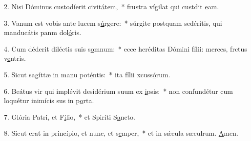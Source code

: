 2. Nisi Dóminus custodíerit civit\uline{á}tem,~* frustra vígilat qui custdit \uline{e}am.\par 
3. Vanum est vobis ante lucem s\uline{ú}rgere:~* súrgite postquam sedéritis, qui manducátis panm dol\uline{ó}ris.\par 
4. Cum déderit diléctis suis s\uline{o}mnum:~* ecce heréditas Dómini fílii: merces, frctus v\uline{e}ntris.\par 
5. Sicut sagíttæ in manu pot\uline{é}ntis:~* ita fílii xcuss\uline{ó}rum.\par 
6. Beátus vir qui implévit desidérium suum ex \uline{i}psis:~* non confundétur cum loquétur inimícis sus in p\uline{o}rta.\par 
7. Glória Patri, et F\uline{í}lio,~* et Spiríti S\uline{a}ncto.\par 
8. Sicut erat in princípio, et nunc, et s\uline{e}mper,~* et in sǽcula sæculrum. \uline{A}men.\par 
